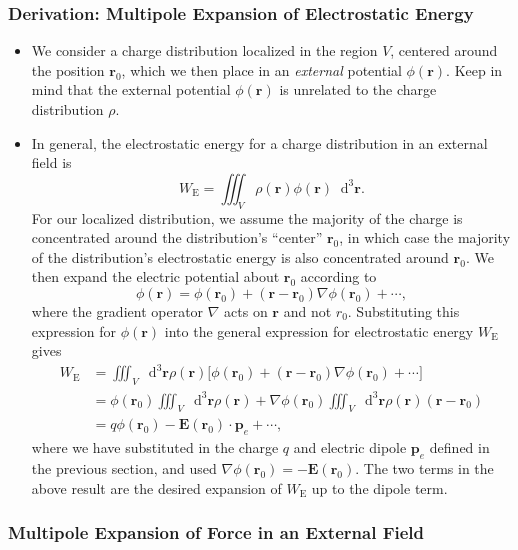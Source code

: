\documentclass[11pt, a4paper]{article}
\newcommand{\diff}{\mathop{}\!\mathrm{d}} %
\newcommand{\dr}{\diff^{3} \r}  %
\renewcommand{\vec}[1]{\bm{#1}} %
\renewcommand{\r}{\vec{r}}
\newcommand{\E}{\vec{E}} %
\newcommand{\pe}{\vec{p}_{e}}  %
\renewcommand{\grad}{\nabla}
\begin{document}
\subsubsection{Derivation: Multipole Expansion of Electrostatic Energy}
\begin{itemize}
    \item We consider a charge distribution localized in the region $ V $, centered around the position $ \r_{0} $, which we then place in an \textit{external} potential $ \phi(\r) $. Keep in mind that the external potential $ \phi(\r) $ is unrelated to the charge distribution $ \rho $.
	
	\item In general, the electrostatic energy for a charge distribution in an external field is
	\begin{equation*}
		W_{\text{E}} = \iiint_{V} \rho(\r) \phi(\r) \dr.
	\end{equation*}
	For our localized distribution, we assume the majority of the charge is concentrated around the distribution's ``center'' $ \r_{0} $, in which case the majority of the distribution's electrostatic energy is also concentrated around $ \r_{0} $. We then expand the electric potential about $ \r_{0} $ according to
	\begin{equation*}
		\phi(\r) = \phi(\r_{0}) + (\r - \r_{0}) \grad \phi(\r_{0}) + \cdots,
	\end{equation*}
    where the gradient operator $ \grad $ acts on $ \r $ and not $ r_{0} $. Substituting this expression for $ \phi(\r) $ into the general expression for electrostatic energy $ W_{\text{E}} $ gives
	\begin{align*}
		W_{\text{E}} &= \iiint_{V}\dr \rho(\r)\big[\phi(\r_{0}) + (\r - \r_{0})\grad \phi(\r_{0}) + \cdots \big]\\
		& = \phi(\r_{0}) \iiint_{V} \dr \rho(\r) + \grad \phi(\r_{0}) \iiint_{V} \dr \rho(\r)(\r - \r_{0})\\
		& = q \phi(\r_{0}) - \E(\r_{0}) \cdot \pe + \cdots,
	\end{align*}
    where we have substituted in the charge $ q $ and electric dipole $ \pe $ defined in the previous section, and used $ \grad\phi(\r_{0}) = - \E(\r_{0}) $. The two terms in the above result are the desired expansion of $ W_{\text{E}} $ up to the dipole term.
	
\end{itemize}

\subsubsection{Multipole Expansion of Force in an External Field}
\end{document}
